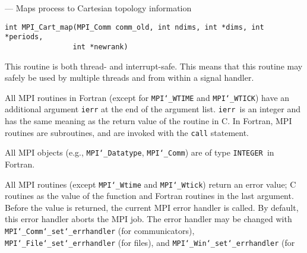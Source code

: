 \startmanpage
{}
--- Maps process to Cartesian topology information  
\startvb\begin{verbatim}
int MPI_Cart_map(MPI_Comm comm_old, int ndims, int *dims, int *periods, 
                int *newrank)

\end{verbatim}
\endvb

\par
{}
\par
{}
\par
This routine is both thread- and interrupt-safe.
This means that this routine may safely be used by multiple threads and
from within a signal handler.
\par
{}
All MPI routines in Fortran (except for {\tt MPI{\tt \char`\_}WTIME} and {\tt MPI{\tt \char`\_}WTICK}) have
an additional argument {\tt ierr} at the end of the argument list.  {\tt ierr
}is an integer and has the same meaning as the return value of the routine
in C.  In Fortran, MPI routines are subroutines, and are invoked with the
{\tt call} statement.
\par
All MPI objects (e.g., {\tt MPI{\tt \char`\_}Datatype}, {\tt MPI{\tt \char`\_}Comm}) are of type {\tt INTEGER
}in Fortran.
\par
{}
\par
All MPI routines (except {\tt MPI{\tt \char`\_}Wtime} and {\tt MPI{\tt \char`\_}Wtick}) return an error value;
C routines as the value of the function and Fortran routines in the last
argument.  Before the value is returned, the current MPI error handler is
called.  By default, this error handler aborts the MPI job.  The error handler
may be changed with {\tt MPI{\tt \char`\_}Comm{\tt \char`\_}set{\tt \char`\_}errhandler} (for communicators),
{\tt MPI{\tt \char`\_}File{\tt \char`\_}set{\tt \char`\_}errhandler} (for files), and {\tt MPI{\tt \char`\_}Win{\tt \char`\_}set{\tt \char`\_}errhandler} (for
